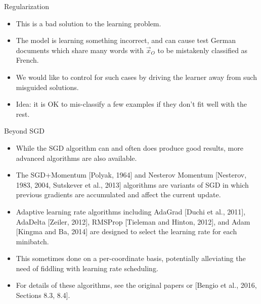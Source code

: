 \documentclass[handout]{beamer}
\begin{document}
\begin{frame}{Regularization}
\begin{scriptsize}
\begin{itemize}
  \item This is a bad solution to the learning problem.
 \item The model is learning something incorrect, and can cause test German documents which share many words with $\vec{x}_O$ to be mistakenly classified as French. 
 \item We would like to control for such cases by driving the learner away from such misguided solutions.
 \item Idea: it is OK to mis-classify a few examples if they don't fit well with the rest.
 
\end{itemize}
\end{scriptsize}

\end{frame}



\begin{frame}{Beyond SGD}
\begin{scriptsize}
\begin{itemize}

 \item While the SGD algorithm can and often does produce good results, more advanced algorithms are also available. 
 \item The SGD+Momentum [Polyak, 1964] and Nesterov Momentum [Nesterov, 1983,
2004, Sutskever et al., 2013] algorithms are variants of SGD in which previous gradients are accumulated and affect the current update.
\item Adaptive learning rate algorithms including AdaGrad [Duchi et al., 2011], AdaDelta [Zeiler, 2012], RMSProp [Tieleman and Hinton, 2012], and Adam [Kingma and Ba, 2014] are designed to select the learning rate for each minibatch.
\item This sometimes done on a per-coordinate basis, potentially alleviating the need of fiddling with learning rate scheduling. 
\item For details of these algorithms, see the original papers or [Bengio et al., 2016, Sections 8.3, 8.4].
 
\end{itemize}
\end{scriptsize}

\end{frame}
\end{document}
